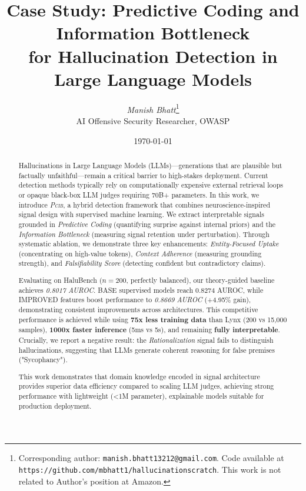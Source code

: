 \documentclass[11pt,letterpaper]{article}
\title{\sffamily\bfseries\huge Case Study: Predictive Coding and Information Bottleneck\\for Hallucination Detection in Large Language Models}
\author{
    \textit{Manish Bhatt}\thanks{Corresponding author: \texttt{manish.bhatt13212@gmail.com}. Code available at \\ \texttt{https://github.com/mbhatt1/hallucinationscratch}. This work is not related to Author's position at Amazon.} \\[0.5em]
    AI Offensive Security Researcher, OWASP
}
\date{\today}
\newcommand{\modelname}{\textsc{Pcib}}
\begin{document}
\maketitle

\begin{abstract}
\noindent Hallucinations in Large Language Models (LLMs)—generations that are plausible but factually unfaithful—remain a critical barrier to high-stakes deployment. Current detection methods typically rely on computationally expensive external retrieval loops or opaque black-box LLM judges requiring 70B+ parameters. In this work, we introduce \textit{\modelname}, a hybrid detection framework that combines neuroscience-inspired signal design with supervised machine learning. We extract interpretable signals grounded in \textit{Predictive Coding} (quantifying surprise against internal priors) and the \textit{Information Bottleneck} (measuring signal retention under perturbation). Through systematic ablation, we demonstrate three key enhancements: \textit{Entity-Focused Uptake} (concentrating on high-value tokens), \textit{Context Adherence} (measuring grounding strength), and \textit{Falsifiability Score} (detecting confident but contradictory claims).

Evaluating on HaluBench ($n=200$, perfectly balanced), our theory-guided baseline achieves \textit{0.8017 AUROC}. BASE supervised models reach 0.8274 AUROC, while IMPROVED features boost performance to \textit{0.8669 AUROC} (+4.95\% gain), demonstrating consistent improvements across architectures. This competitive performance is achieved while using \textbf{75x less training data} than Lynx (200 vs 15,000 samples), \textbf{1000x faster inference} (5ms vs 5s), and remaining \textbf{fully interpretable}. Crucially, we report a negative result: the \textit{Rationalization} signal fails to distinguish hallucinations, suggesting that LLMs generate coherent reasoning for false premises ("Sycophancy").

This work demonstrates that domain knowledge encoded in signal architecture provides superior data efficiency compared to scaling LLM judges, achieving strong performance with lightweight (<1M parameter), explainable models suitable for production deployment.
\end{abstract}

\end{document}
